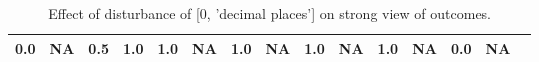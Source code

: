 \begin{table}
\begin{tabular}{l|cc|cc|cc|cc|cc|cc|cc}
\cellcolor{Bittersweet}0.0&\cellcolor{Bittersweet}NA&\cellcolor{Bittersweet}0.5&\cellcolor{Bittersweet}1.0&\cellcolor{Bittersweet}1.0&\cellcolor{Bittersweet}NA&\cellcolor{Bittersweet}1.0&\cellcolor{Bittersweet}NA&\cellcolor{Bittersweet}1.0&\cellcolor{Bittersweet}NA&\cellcolor{Bittersweet}1.0&\cellcolor{Bittersweet}NA&\cellcolor{Bittersweet}0.0&\cellcolor{Bittersweet}NA\\\bottomrule\end{tabular}\caption{Effect of disturbance of [0, 'decimal places'] on strong view of outcomes.}\end{table}